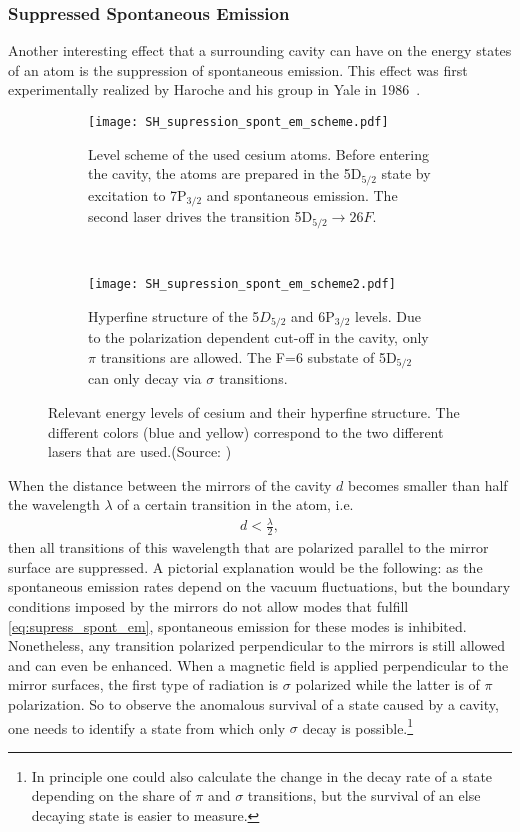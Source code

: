 \subsubsection{Suppressed Spontaneous Emission}
Another interesting effect that a surrounding cavity can have on the energy
states of an atom is the suppression of spontaneous emission. This effect was
first experimentally realized by Haroche and his group in Yale in
1986~\cite{haroche1987SupressedEmission}. 
\begin{figure}[h]
  \centering
  \begin{subfigure}[t]{.48\linewidth}
    \centering
    \texttt{[image: SH\_supression\_spont\_em\_scheme.pdf]}
    \caption{Level scheme of the used cesium atoms. Before entering the cavity,
    the atoms are prepared in the 5D$_{5/2}$ state by excitation to 7P$_{3/2}$
    and spontaneous emission. The second laser drives the transition
  5D$_{5/2} \rightarrow 26F$.}
    \label{fig:supression_scheme1}
  \end{subfigure}
  ~
  \begin{subfigure}[t]{.48\linewidth}
    \centering
    \texttt{[image: SH\_supression\_spont\_em\_scheme2.pdf]}
    \caption{Hyperfine structure of the 5$D_{5/2}$ and 6P$_{3/2}$ levels. Due to
    the polarization dependent cut-off in the cavity, only $\pi$ transitions are
    allowed. The F=6 substate of 5D$_{5/2}$ can only decay via
  $\sigma$ transitions.}
  \label{fig:supression_scheme2}
  \end{subfigure}
  \caption{Relevant energy levels of cesium and their hyperfine structure. The
  different colors (blue and yellow) correspond to the two different lasers that
are used.(Source: \cite{haroche1987SupressedEmission})}
\end{figure}
When the distance between the mirrors
of the cavity $d$ becomes smaller than half the wavelength $\lambda$ of a
certain transition in the atom, i.e.
\begin{align}
  \label{eq:supress_spont_em}
  d < \frac{\lambda}{2},
\end{align}
then all transitions of this wavelength that are polarized 
parallel to the mirror surface are suppressed. A pictorial explanation would be
the following: as the spontaneous emission rates depend on the vacuum
fluctuations, but the boundary conditions imposed by the mirrors do not allow
modes that fulfill \eqref{eq:supress_spont_em}, spontaneous emission for
these modes is inhibited. Nonetheless, any  transition polarized
perpendicular to the mirrors is still allowed and can even be enhanced. When a
magnetic field is applied perpendicular to the mirror surfaces, the first type
of radiation is $\sigma$ polarized while the latter is of $\pi$ polarization. So to
observe the anomalous survival of a state caused by a cavity, one needs to
identify a state from which only $\sigma$ decay is possible.\footnote{In
principle one could also calculate the change in the decay rate of a state
depending on the share of $\pi$ and $\sigma$ transitions, but the survival of an
else decaying state is easier to measure.}

